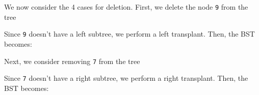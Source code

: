 \documentclass[a4paper, openany]{memoir}
\begin{document}
\noindent We now consider the 4 cases for deletion. First, we delete the node \texttt{9} from the tree
\begin{center}
\end{center}
Since \texttt{9} doesn't have a left subtree, we perform a left transplant. Then, the BST becomes:
\begin{center}
\end{center}
Next, we consider removing \texttt{7} from the tree
\begin{center}
\end{center}
Since \texttt{7} doesn't have a right subtree, we perform a right transplant. Then, the BST becomes:
\end{document}
